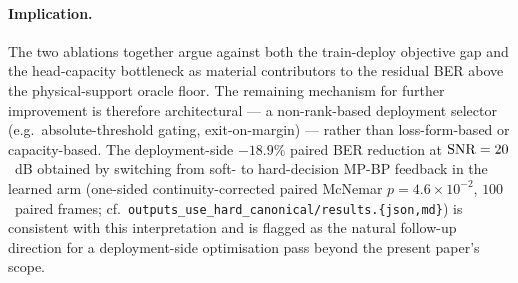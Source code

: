 \paragraph{Implication.} The two ablations together argue against both the train-deploy objective gap and the head-capacity bottleneck as material contributors to the residual BER above the physical-support oracle floor. The remaining mechanism for further improvement is therefore architectural --- a non-rank-based deployment selector (e.g.\ absolute-threshold gating, exit-on-margin) --- rather than loss-form-based or capacity-based. The deployment-side $-18.9\%$ paired BER reduction at $\mathrm{SNR} = 20$~dB obtained by switching from soft- to hard-decision MP-BP feedback in the learned arm (one-sided continuity-corrected paired McNemar $p = 4.6 \times 10^{-2}$, $100$~paired frames; cf.\ \texttt{outputs\_use\_hard\_canonical/results.\{json,md\}}) is consistent with this interpretation and is flagged as the natural follow-up direction for a deployment-side optimisation pass beyond the present paper's scope.

